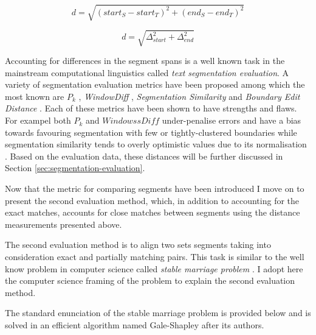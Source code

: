     \begin{equation} \label{eq:distance}
    d= \sqrt{(start_S - start_T)^{2}+(end_S-end_T)^{2}}
    \end{equation}
    
    \begin{equation} \label{eq:distance-simpliefied}
    d= \sqrt{\varDelta_{start} ^{2}+\varDelta_{end}^{2}}
    \end{equation}
    
    Accounting for differences in the segment spans is a well known task in the mainstream computational linguistics called \textit{text segmentation evaluation}. A variety of segmentation evaluation metrics have been proposed among which the most known are $P_k$ \citep[198--200]{beeferman1999statistical}, \textit{WindowDiff} \citep[10]{pevzner2002critique}, \textit{Segmentation Similarity} \citep[154-156]{fournier2012segmentation} and \textit{Boundary Edit Distance} \citep{fournier2013evaluating}. Each of these metrics have been shown to have strengths and flaws. For exampel both $P_k$ and $WindowssDiff$ under-penalise errors \citep{lamprier2007evaluation} and have a bias towards favouring segmentation with few or tightly-clustered boundaries \citep{niekrasz2010unbiased} while segmentation similarity tends to overly optimistic values due to its normalisation \citep{fournier2013evaluating}. Based on the evaluation data, these distances will be further discussed in Section \ref{sec:segmentation-evaluation}. 
    

    Now that the metric for comparing segments have been introduced I move on to present the second evaluation method, which, in addition to accounting for the exact matches, accounts for close matches between segments using the distance measurements presented above. 
    
    The second evaluation method is to align two sets segments taking into consideration exact and partially matching pairs. This task is similar to the well know problem in computer science called \textit{stable marriage problem} \citep{Gusfield1989}. I adopt here the computer science framing of the problem to explain the second evaluation method.
    
    The standard enunciation of the stable marriage problem is provided below and is solved in an efficient algorithm named Gale-Shapley \citep{Gale1962} after its authors.
    
